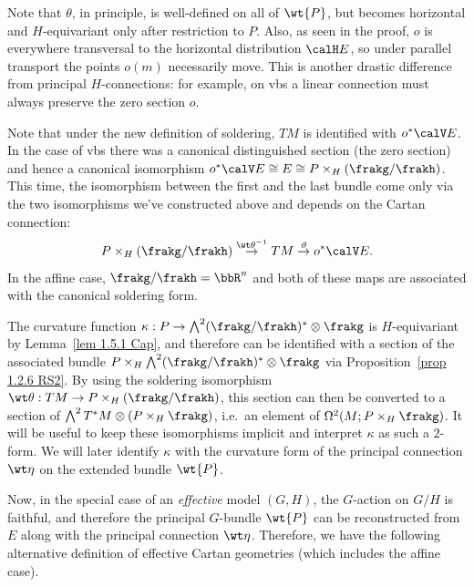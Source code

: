 Note that $\theta$, in principle, is well-defined on all of $\wt{P}$, but becomes horizontal and $H$-equivariant only after restriction to $P$. Also, as seen in the proof, $o$ is everywhere transversal to the horizontal distribution $\calH E$, so under parallel transport the points $o(m)$ necessarily move. This is another drastic difference from principal $H$-connections: for example, on \glspl{vb} a linear connection must always preserve the zero section $o$.

\begin{rem}
    Note that under the new definition of soldering, $TM$ is identified with $o^\ast \calV E$. In the case of \glspl{vb} there was a canonical distinguished section (the zero section) and hence a canonical isomorphism $o^\ast\calV E\cong E\cong P\times_H (\frakg\slash\frakh)$. This time, the isomorphism between the first and the last bundle come only via the two isomorphisms we've constructed above and depends on the Cartan connection:
    \[P\times_H(\frakg\slash\frakh)\overset{{\wt\theta}^{-1}}{\to}TM\overset{\vartheta}{\to}o^\ast\calV E.\]
    In the affine case, $\frakg\slash\frakh=\bbR^n$ and both of these maps are associated with the canonical soldering form.
\end{rem}

\begin{rem}
    The curvature function $\kappa:P\to \bigwedge^2(\frakg\slash\frakh)^\ast\otimes\frakg$ is $H$-equivariant by Lemma~\ref{lem 1.5.1 Cap}, and therefore can be identified with a section of the associated bundle $P\times_H \bigwedge^2(\frakg\slash\frakh)^\ast\otimes\frakg$ via Proposition~\ref{prop 1.2.6 RS2}. By using the soldering isomorphism $\wt\theta:TM\to P\times_H(\frakg\slash\frakh)$, this section can then be converted to a section of $\bigwedge^2T^\ast M\otimes (P\times_H\frakg)$, i.e.\ an element of $\Omega^2(M;P\times_H\frakg)$. It will be useful to keep these isomorphisms implicit and interpret $\kappa$ as such a $2$-form. We will later identify $\kappa$ with the curvature form of the principal connection $\wt\eta$ on the extended bundle $\wt{P}$.
\end{rem}


Now, in the special case of an \emph{effective} model $(G,H)$, the $G$-action on $G\slash H$ is faithful, and therefore the principal $G$-bundle $\wt{P}$ can be reconstructed from $E$ along with the principal connection $\wt\eta$. Therefore, we have the following alternative definition of effective Cartan geometries (which includes the affine case).


